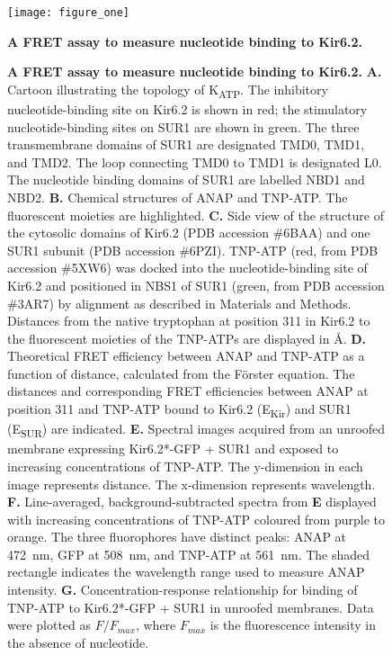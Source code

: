 \documentclass[10pt,lineno, doublespacing]{elife_modified}
\begin{document}
\begin{figure}
\begin{fullwidth}
\centering
\texttt{[image: figure\_one]}
\caption{\textbf{A FRET assay to measure nucleotide binding to Kir6.2.}}
\label{fig:one}
\end{fullwidth}
\end{figure}
\begin{figure}\ContinuedFloat
\begin{fullwidth}
\caption{
\textbf{A FRET assay to measure nucleotide binding to Kir6.2.}
\textbf{A.}
Cartoon illustrating the topology of K\textsubscript{ATP}.
The inhibitory nucleotide-binding site on Kir6.2 is shown in red; the stimulatory nucleotide-binding sites on SUR1 are shown in green.
The three transmembrane domains of SUR1 are designated TMD0, TMD1, and TMD2.
The loop connecting TMD0 to TMD1 is designated L0.
The nucleotide binding domains of SUR1 are labelled NBD1 and NBD2.
\textbf{B.}
Chemical structures of ANAP and TNP-ATP. The fluorescent moieties are highlighted.
\textbf{C.}
Side view of the structure of the cytosolic domains of Kir6.2 (PDB accession \#6BAA) and one SUR1 subunit (PDB accession \#6PZI).
TNP-ATP (red, from PDB accession \#5XW6) was docked into the nucleotide-binding site of Kir6.2 and positioned in NBS1 of SUR1 (green, from PDB accession \#3AR7) by alignment as described in Materials and Methods.
Distances from the native tryptophan at position 311 in Kir6.2 to the fluorescent moieties of the TNP-ATPs are displayed in \si{\angstrom}.
\textbf{D.}
Theoretical FRET efficiency between ANAP and TNP-ATP as a function of distance, calculated from the Förster equation.
The distances and corresponding FRET efficiencies between ANAP at position 311 and TNP-ATP bound to Kir6.2 (E\textsubscript{Kir}) and SUR1 (E\textsubscript{SUR}) are indicated.
\textbf{E.}
Spectral images acquired from an unroofed membrane expressing Kir6.2*-GFP + SUR1 and exposed to increasing concentrations of TNP-ATP.
The y-dimension in each image represents distance.
The x-dimension represents wavelength.
\textbf{F.}
Line-averaged, background-subtracted spectra from \textbf{E} displayed with increasing concentrations of TNP-ATP coloured from purple to orange.
The three fluorophores have distinct peaks: ANAP at \SI{472}{\nano\metre}, GFP at \SI{508}{\nano\metre}, and TNP-ATP at \SI{561}{\nano\metre}.
The shaded rectangle indicates the wavelength range used to measure ANAP intensity.
\textbf{G.}
Concentration-response relationship for binding of TNP-ATP to Kir6.2*-GFP + SUR1 in unroofed membranes.
Data were plotted as $F/F_{max}$, where $F_{max}$ is the fluorescence intensity in the absence of nucleotide.
}
\end{fullwidth}
\end{figure}
\end{document}
